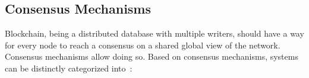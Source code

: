 \subsection{Consensus Mechanisms}\label{subsec:consensus}
Blockchain, being a distributed database with multiple writers, should have a
way for every node to reach a consensus on a shared global view of the network.
Consensus mechanisms allow doing so. Based on consensus mechanisms, systems can
be distinctly categorized into~\cite{mingxiao2017review}:
